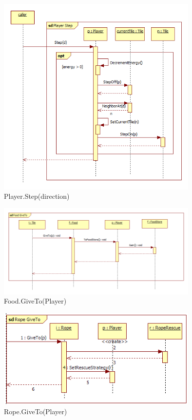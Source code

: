 \begin{figure}[H]
	\begin{center}
		\includegraphics[width=10cm]{chapters/chapter03/seqdiag/Player_Step.png}
		\caption{Player.Step(direction)}
		\label{fig:PlayerStep}
	\end{center}
\end{figure}
\begin{figure}[H]
	\begin{center}
		\includegraphics[width=10cm]{chapters/chapter03/seqdiag/Food_GiveTo.png}
		\caption{Food.GiveTo(Player)}
		\label{fig:FoodGiveTo}
	\end{center}
\end{figure}
\begin{figure}[H]
	\begin{center}
		\includegraphics[width=10cm]{chapters/chapter03/seqdiag/Rope_GiveTo.png}
		\caption{Rope.GiveTo(Player)}
		\label{fig:RopeGiveTo}
	\end{center}
\end{figure}
